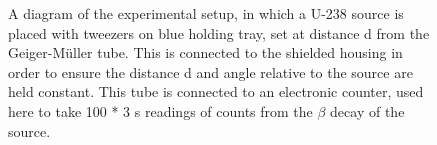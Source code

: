 \documentclass[11pt]{article}
\begin{document}
    \begin{figure}[ht]
        \begin{center}
            \def\svgwidth{\columnwidth}
            
             \caption{A diagram of the experimental setup, in which a U-238 source is placed with tweezers on blue holding tray, set at distance d from the Geiger-Müller tube. This is connected to the shielded housing in order to ensure the distance d and angle relative to the source are held constant. This tube is connected to an electronic counter, used here to take  100 * 3 s readings of counts from the $\beta$ decay of the source.}
             \label{fig:experimental setup}
        \end{center}
    \end{figure}
\end{document}

